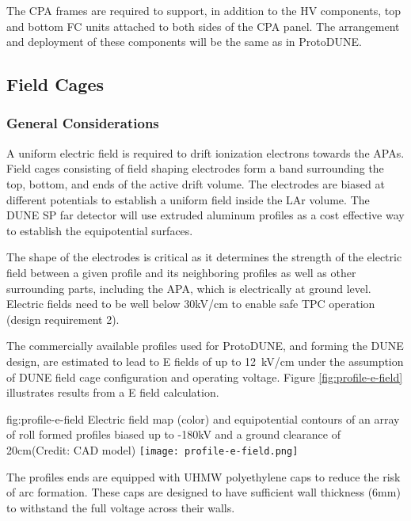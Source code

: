 The CPA frames are required to support, in addition to the HV components, top and bottom FC units attached to both sides of the CPA panel. The arrangement and deployment of these components will be the same as in ProtoDUNE.  

\subsection{Field Cages}

\subsubsection{General Considerations}

A uniform electric field is required to drift ionization electrons towards the APAs. Field cages consisting of field shaping electrodes form a band surrounding the top, bottom, and ends of the active drift volume. The electrodes are biased at different potentials to establish a uniform field inside the LAr volume.
The DUNE SP far detector will use extruded aluminum profiles as a cost effective way to establish the equipotential surfaces. 

The shape of the electrodes is critical as it determines the strength of the electric field between a given profile and its neighboring profiles as well as
other surrounding parts, including the APA, which is electrically at ground level. Electric fields need to be well below 30kV/cm 
to enable safe TPC operation (design requirement 2).

The commercially available profiles used for ProtoDUNE, and forming the DUNE design, are estimated to lead to E fields of up to 12~kV/cm under the assumption of DUNE field cage configuration 
and operating voltage. Figure \ref{fig:profile-e-field} illustrates results from a E field calculation.

\begin{dunefigure}
{fig:profile-e-field}
{Electric field map (color) and equipotential contours of an array of roll formed profiles biased up to -180kV and a ground clearance of 20cm(Credit: CAD model)} \texttt{[image: profile-e-field.png]}
\end{dunefigure}

The profiles ends are equipped with UHMW polyethylene caps to reduce the risk of arc formation.  These caps are designed to have sufficient wall thickness (6mm) to withstand the full voltage across their walls.

